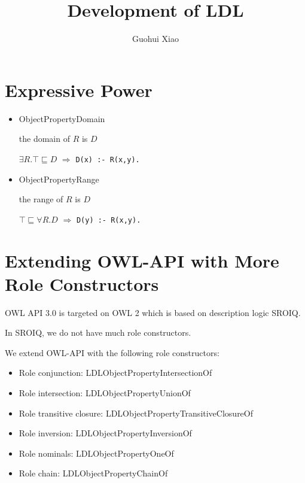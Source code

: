\documentclass{article}
\begin{document}
\title{Development of LDL}

\author{Guohui Xiao}

\newcommand{\La}{\Leftarrow}
\newcommand{\Ra}{\Rightarrow}

\maketitle

\section{Expressive Power}

\begin{itemize}
\item ObjectPropertyDomain

the domain of $R$ is $D$

$\exists R.\top \sqsubseteq D$  $\Ra$ \verb|D(x) :- R(x,y).|

\item 
ObjectPropertyRange

the range of $R$ is $D$

$\top \sqsubseteq \forall R.D$ $\Ra$ \verb|D(y) :- R(x,y).|

\end{itemize}



\section{Extending OWL-API with More Role Constructors}

OWL API 3.0 is targeted on OWL 2 which is based on description logic
SROIQ.

In SROIQ, we do not have much role constructors.

We extend OWL-API
with the following role constructors:
\begin{itemize}
\item Role conjunction: LDLObjectPropertyIntersectionOf
\item Role intersection: LDLObjectPropertyUnionOf
\item Role transitive closure: LDLObjectPropertyTransitiveClosureOf
\item Role inversion: LDLObjectPropertyInversionOf
\item Role nominals: LDLObjectPropertyOneOf
\item Role chain: LDLObjectPropertyChainOf
\end{itemize}
 
\end{document}
